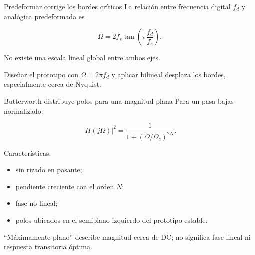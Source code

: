 \documentclass[
  ignorenonframetext,
  aspectratio=169,
  spanish,
  professionalfonts]{beamer}
\providecommand{\tightlist}{%
  \setlength{\itemsep}{0pt}\setlength{\parskip}{0pt}}
\begin{document}
\begin{frame}{Predeformar corrige los bordes críticos}
\protect{}\label{predeformar-corrige-los-bordes-cruxedticos}
La relación entre frecuencia digital \(f_d\) y analógica predeformada es

\[
\Omega=2f_s\tan\left(\pi\frac{f_d}{f_s}\right).
\]

No existe una escala lineal global entre ambos ejes.

\begin{tcolorbox}[enhanced jigsaw, arc=.35mm, bottomrule=.15mm, bottomtitle=1mm, breakable, colback=white, colbacktitle=quarto-callout-warning-color!10!white, colframe=quarto-callout-warning-color-frame, coltitle=black, left=2mm, leftrule=.75mm, opacityback=0, opacitybacktitle=0.6, rightrule=.15mm, title={Error frecuente}, titlerule=0mm, toprule=.15mm, toptitle=1mm]

Diseñar el prototipo con \(\Omega=2\pi f_d\) y aplicar bilineal desplaza
los bordes, especialmente cerca de Nyquist.

\end{tcolorbox}
\end{frame}

\begin{frame}{Butterworth distribuye polos para una magnitud plana}
\protect{}\label{butterworth-distribuye-polos-para-una-magnitud-plana}
Para un pasa-bajas normalizado:

\[
|H(j\Omega)|^2=\frac{1}{1+(\Omega/\Omega_c)^{2N}}.
\]

Características:

\begin{itemize}
\tightlist
\item
  sin rizado en pasante;
\item
  pendiente creciente con el orden \(N\);
\item
  fase no lineal;
\item
  polos ubicados en el semiplano izquierdo del prototipo estable.
\end{itemize}

\begin{tcolorbox}[enhanced jigsaw, arc=.35mm, bottomrule=.15mm, bottomtitle=1mm, breakable, colback=white, colbacktitle=quarto-callout-note-color!10!white, colframe=quarto-callout-note-color-frame, coltitle=black, left=2mm, leftrule=.75mm, opacityback=0, opacitybacktitle=0.6, rightrule=.15mm, title={Interpretación}, titlerule=0mm, toprule=.15mm, toptitle=1mm]

``Máximamente plano'' describe magnitud cerca de DC; no significa fase
lineal ni respuesta transitoria óptima.

\end{tcolorbox}
\end{frame}
\end{document}
